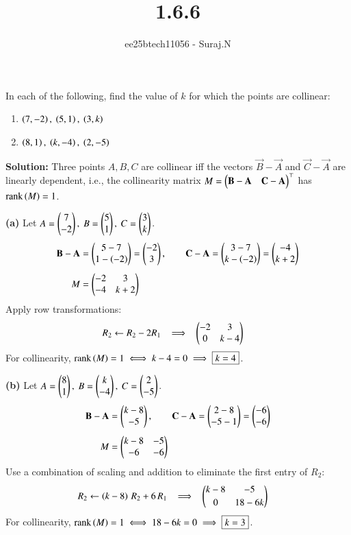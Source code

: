 \documentclass[journal,12pt,onecolumn]{IEEEtran}
\theoremstyle{remark}
\begin{document}
\title{1.6.6}
\author{ee25btech11056 - Suraj.N}
\maketitle
\renewcommand{\thefigure}{\theenumi}
\renewcommand{\thetable}{\theenumi}

\item In each of the following, find the value of $k$ for which the points are collinear:
\begin{enumerate}
\item $\brak{7,-2},\ \brak{5,1},\ \brak{3,k}$
\item $\brak{8,1},\ \brak{k,-4},\ \brak{2,-5}$
\end{enumerate}

\textbf{Solution:} Three points $A, B, C$ are collinear iff the vectors $\vec{B}-\vec{A}$ and $\vec{C}-\vec{A}$ are linearly dependent, i.e., the collinearity matrix
\(
M=\begin{pmatrix} \mathbf{B}-\mathbf{A} & \mathbf{C}-\mathbf{A} \end{pmatrix}^\top
\)
has $\operatorname{rank}\left(M\right)=1$.

\textbf{(a)} Let $A=\myvec{7\\-2},\ B=\myvec{5\\1},\ C=\myvec{3\\k}$.
\begin{align*}
\mathbf{B}-\mathbf{A}&=\begin{pmatrix}5-7\\1-\left(-2\right)\end{pmatrix}=\begin{pmatrix}-2\\3\end{pmatrix},\qquad
\mathbf{C}-\mathbf{A}=\begin{pmatrix}3-7\\k-\left(-2\right)\end{pmatrix}=\begin{pmatrix}-4\\k+2\end{pmatrix}\\[4pt]
M&=\begin{pmatrix}-2 & 3\\ -4 & k+2\end{pmatrix}
\end{align*}
Apply row transformations:
\begin{align*}
R_2 &\leftarrow R_2 - 2R_1
\;\;\implies\;\;
\begin{pmatrix}-2 & 3\\ 0 & k-4\end{pmatrix}
\end{align*}
For collinearity, $\operatorname{rank}\left(M\right)=1 \iff k-4=0 \implies \boxed{k=4}$.

\textbf{(b)} Let $A=\myvec{8\\1},\ B=\myvec{k\\-4},\ C=\myvec{2\\-5}$.
\begin{align*}
\mathbf{B}-\mathbf{A}&=\begin{pmatrix}k-8\\-5\end{pmatrix},\qquad
\mathbf{C}-\mathbf{A}=\begin{pmatrix}2-8\\-5-1\end{pmatrix}=\begin{pmatrix}-6\\-6\end{pmatrix}\\[4pt]
M&=\begin{pmatrix}k-8 & -5\\ -6 & -6\end{pmatrix}
\end{align*}
Use a combination of scaling and addition to eliminate the first entry of $R_2$:
\begin{align*}
R_2 &\leftarrow \left(k-8\right)\,R_2 + 6\,R_1
\;\;\implies\;\;
\begin{pmatrix}k-8 & -5\\[2pt] 0 & 18-6k\end{pmatrix}
\end{align*}
For collinearity, $\operatorname{rank}\left(M\right)=1 \iff 18-6k=0 \implies \boxed{k=3}$.
\end{document}
